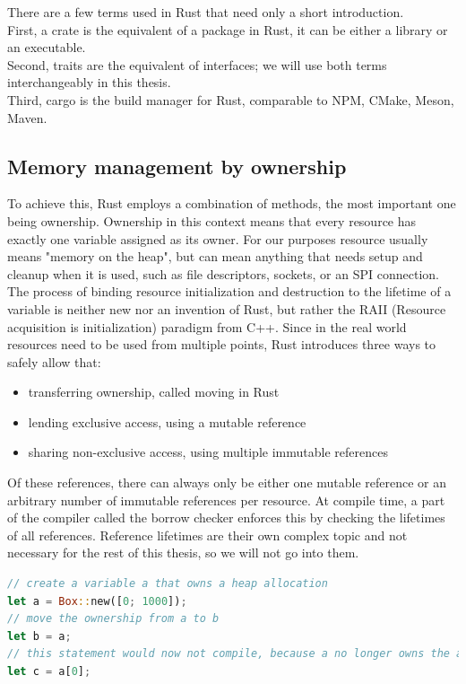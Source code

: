 There are a few terms used in Rust that need only a short introduction.\\
First, a crate is the equivalent of a package in Rust, it can be either a library or an executable.\\
Second, traits are the equivalent of interfaces; we will use both terms interchangeably in this thesis.\\
Third, cargo is the build manager for Rust, comparable to NPM, CMake, Meson, Maven.

\subsection{Memory management by ownership}
\label{sec:background:rust:ownership}

To achieve this, Rust employs a combination of methods, the most important one being ownership.
Ownership in this context means that every resource has exactly one variable assigned as its owner.
For our purposes resource usually means "memory on the heap",
but can mean anything that needs setup and cleanup when it is used,
such as file descriptors, sockets, or an SPI connection.
The process of binding resource initialization and destruction to the lifetime of a variable is neither new
nor an invention of Rust,
but rather the RAII (Resource acquisition is initialization) paradigm from C++.
Since in the real world resources need to be used from multiple points, Rust introduces three ways to safely allow that:
\begin{itemize}
    \item transferring ownership, called moving in Rust
    \item lending exclusive access, using a mutable reference
    \item sharing non-exclusive access, using multiple immutable references
\end{itemize}

Of these references, there can always only be either one mutable reference or an arbitrary number of immutable references per resource.
At compile time, a part of the compiler called the borrow checker enforces this by checking the lifetimes of all references.
Reference lifetimes are their own complex topic and not necessary for the rest of this thesis, so we will not go into them.

\begin{lstlisting}[language=Rust,style=colouredRust]
// create a variable a that owns a heap allocation
let a = Box::new([0; 1000]);
// move the ownership from a to b
let b = a;
// this statement would now not compile, because a no longer owns the allocation
let c = a[0];
\end{lstlisting}

